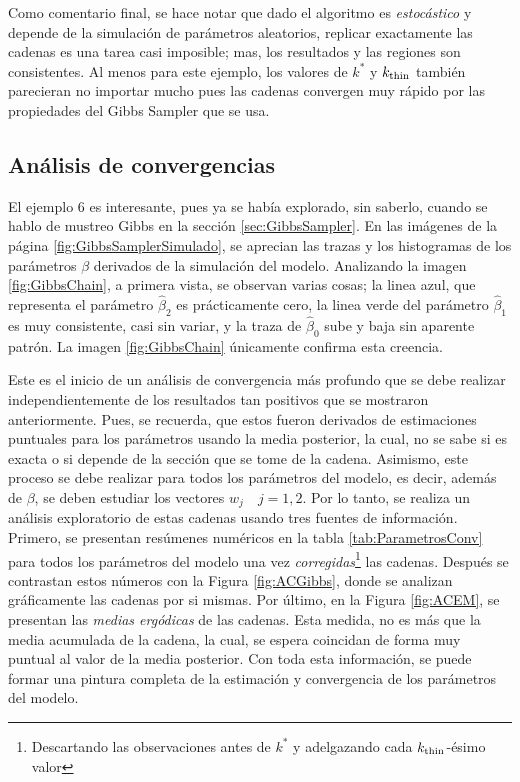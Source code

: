 \documentclass[../Main/Main.tex]{subfiles}
\begin{document}
Como comentario final, se hace notar que dado el algoritmo es \textit{estocástico} y depende de la simulación de parámetros aleatorios, replicar exactamente las cadenas es una tarea casi imposible; mas, los resultados y las regiones son consistentes. Al menos para este ejemplo, los valores de $k^*$ y $k_{\text{thin}}$ también parecieran no importar mucho pues las cadenas convergen muy rápido por las propiedades del Gibbs Sampler que se usa. 

\subsection{Análisis de convergencias} \label{sec:AnalisisConv}
El ejemplo 6 es interesante, pues ya se había explorado, sin saberlo, cuando se hablo de mustreo Gibbs en la sección \ref{sec:GibbsSampler}. En las imágenes de la página \ref{fig:GibbsSamplerSimulado}, se aprecian las trazas y los histogramas de los parámetros $\beta$ derivados de la simulación del modelo. Analizando la imagen \ref{fig:GibbsChain}, a primera vista, se observan varias cosas; la linea azul, que representa el parámetro $\hat{\beta}_2$ es prácticamente cero, la linea verde del parámetro $\hat{\beta}_1$ es muy consistente, casi sin variar, y la traza de $\hat{\beta}_0$ sube y baja sin aparente patrón. La imagen \ref{fig:GibbsChain} únicamente confirma esta creencia.

Este es el inicio de un análisis de convergencia más profundo que se debe realizar independientemente de los resultados tan positivos que se mostraron anteriormente. Pues, se recuerda, que estos fueron derivados de estimaciones puntuales para los parámetros usando la media posterior, la cual, no se sabe si es exacta o si depende de la sección que se tome de la cadena. Asimismo, este proceso se debe realizar para todos los parámetros del modelo, es decir, además de $\beta$, se deben estudiar los vectores $w_j \quad j = 1,2$. Por lo tanto, se realiza un análisis exploratorio de estas cadenas usando tres fuentes de información. Primero, se presentan resúmenes numéricos en la tabla \ref{tab:ParametrosConv} para todos los parámetros del modelo una vez \textit{corregidas}\footnote{Descartando las observaciones antes de $k^*$ y adelgazando cada $k_{\text{thin}}$-ésimo valor} las cadenas. Después se contrastan estos números con la Figura \ref{fig:ACGibbs}, donde se  analizan gráficamente las cadenas por si mismas. Por último, en la Figura \ref{fig:ACEM}, se presentan las \textit{medias ergódicas} de las cadenas. Esta medida, no es más que la media acumulada de la cadena, la cual, se espera coincidan de forma muy puntual al valor de la media posterior. Con toda esta información, se puede formar una pintura completa de la estimación y convergencia de los parámetros del modelo.
\end{document}
